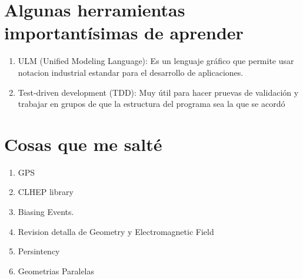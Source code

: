 \documentclass[10pt,a4paper,oneside]{book}
\begin{document}
\section*{Algunas herramientas importantísimas de aprender}
\begin{enumerate}
\item ULM (Unified Modeling Language): Es un lenguaje gráfico que
  permite usar notacion industrial estandar para el desarrollo de
  aplicaciones.
\item Test-driven development (TDD): Muy útil para hacer pruevas de
  validación y trabajar en grupos de que la estructura del programa
  sea la que se acordó
\end{enumerate}

\section*{Cosas que me salté}
\begin{enumerate}
\item GPS
\item CLHEP library
\item Biasing Events.
\item Revision detalla de Geometry y Electromagnetic Field
\item Persintency
\item Geometrias Paralelas
\end{enumerate}
\end{document}
